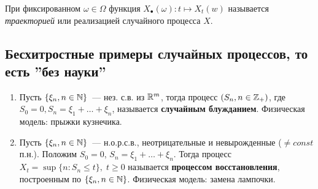 \begin{definition}
    При фиксированном $\omega \in \Omega$ функция $X_{\bullet}(\omega): t \mapsto X_t(w)$ называется \textit{траекторией} или реализацией случайного процесса $X$.
\end{definition}




\subsection*{Бесхитростные примеры случайных процессов, то есть ''без науки''}
\begin{enumerate}
    \item  Пусть $\{ \xi_n, n \in \mathbb{N} \}$~--- нез. с.в. из $\mathbb{R}^m$, тогда процесс $(S_n, n \in \mathbb{Z}_+)$, где $S_0 = 0, S_n = \xi_1 + \ldots + \xi_n$, называется \textbf{случайным блужданием}.
    Физическая модель: прыжки кузнечика.
    \item Пусть $\{ \xi_n, n \in \mathbb{N} \}$~--- н.о.р.с.в., неотрицательные и невырожденные ($\neq const$ п.н.). Положим $S_0 = 0$, $S_n = \xi_1 + \ldots + \xi_n$. Тогда процесс $X_t = \sup\{n : S_n \leq t\}, \; t \geq 0$ называется \textbf{процессом восстановления}, построенным по $\{ \xi_n, n \in \mathbb{N} \}$.
    Физическая модель: замена лампочки.
\end{enumerate}
